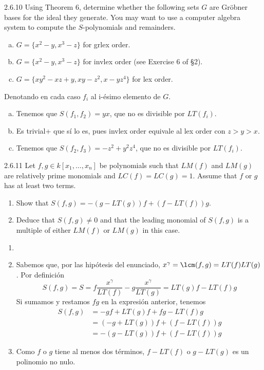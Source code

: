 \documentclass[twoside]{article}
\begin{document}
\begin{ejercicio}{2.6.10}
Using Theorem 6, determine whether the following sets $G$ are Gröbner bases for the
ideal they generate. You may want to use a computer algebra system to compute the
$S$-polynomials and remainders.
\begin{enumerate}[a.]
\item $G = \{x^2 − y, x^3 − z\}$ for grlex order.
\item $G = \{x^2 − y, x^3 − z\}$ for invlex order (see Exercise 6 of §2).
\item $G = \{xy^2 − xz + y, xy − z^2, x − yz^4\}$ for lex order.
\end{enumerate}
\end{ejercicio}
\begin{solucion}
Denotando en cada caso $f_i$ al i-ésimo elemento de $G$.
\begin{enumerate}[a.]
\item Tenemos que $S(f_1,f_2)=yx$, que no es divisible por $LT(f_i)$. 
\item Es trivial+ que sí lo es, pues invlex order equivale al lex order con $z>y>x$.
\item Tenemos que $S(f_2,f_3)=-z^2+y^2z^4$, que no es divisible por $LT(f_i)$.
\end{enumerate}
\end{solucion}

\newpage

\begin{ejercicio}{2.6.11}
Let $f , g ∈ k[x_1,\dots , x_n]$ be polynomials such that $LM( f )$ and $LM(g)$ are relatively prime
monomials and $LC( f) = LC(g) = 1$. Assume that $f$ or $g$ has at least two terms.
\begin{enumerate}
\item Show that $S( f , g) = −(g − LT(g))f + (f − LT( f ))g$.
\item Deduce that $S( f , g) \neq 0$ and that the leading monomial of $S( f , g)$ is a multiple of
either $LM( f )$ or $LM(g)$ in this case.
\end{enumerate}
\end{ejercicio}
\begin{solucion}
\begin{enumerate}
\item[]
\item Sabemos que, por las hipótesis del enunciado, $x^\gamma=\lcm(f,g)=LT(f)LT(g)$. Por definición
$$S(f,g)= S=f\frac{x^{\gamma}}{LT(f)}-g\frac{x^{\gamma}}{LT(g)} = LT(g)f-LT(f)g
$$
Si sumamos y restamos $fg$ en la expresión anterior, tenemos
\begin{align*}
S(f,g)&=-gf+LT(g)f +fg-LT(f)g\\
&=(-g+LT(g))f+(f-LT(f))g \\
&=-(g-LT(g))f+(f-LT(f))g
\end{align*}
\item Como $f$ o $g$ tiene al menos dos términos, $f-LT(f)$ o $g-LT(g)$ es un polinomio no nulo.
\end{enumerate}
\end{solucion}
\end{document}
